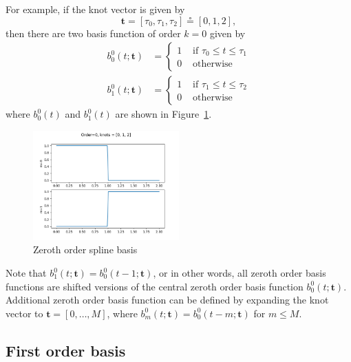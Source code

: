 \documentclass{article}
\newcommand{\defeq}{\circeq}
\begin{document}
For example, if the knot vector is given by
\[
\mathbf{t} = [\tau_0, \tau_1, \tau_2] \defeq [0, 1, 2],
\]
then there are two basis function of order $k=0$ given by
\begin{align*}
b_0^0(t; \mathbf{t}) &= \begin{cases} 1 & \text{~if~} \tau_0 \leq t \leq \tau_1 \\ 
 									 0 & \text{~otherwise} 
 			\end{cases}
\\ 
b_1^0(t; \mathbf{t}) &= \begin{cases} 1 & \text{~if~} \tau_1 \leq t \leq \tau_2 \\ 
 									 0 & \text{~otherwise}
 			\end{cases}
\end{align*}
where $b_0^0(t)$ and $b_1^0(t)$ are shown in Figure~\ref{fig:spline_basis_0}.
\begin{figure}[hbt]
  \centering\includegraphics[width=0.5\textwidth]{./figures/spline_basis_0}
  \caption{Zeroth order spline basis}
  \label{fig:spline_basis_0}  
\end{figure}
Note that $b_1^0(t; \mathbf{t}) = b_0^0(t-1; \mathbf{t})$, or in other words, all zeroth order basis functions are shifted versions of the central zeroth order basis function $b_0^0(t; \mathbf{t})$.  Additional zeroth order basis function can be defined by expanding the knot vector to $\mathbf{t}=[0, \dots, M]$, where $b_m^0(t; \mathbf{t})= b_0^0(t-m; \mathbf{t})$ for $m\leq M$.

\clearpage


\subsection{First order basis}
\end{document}
